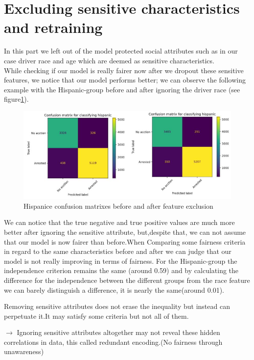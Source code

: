 \documentclass[doctype=studienarbeit,lang=english,BCOR=15mm,biblatex]{ldvbook}
\begin{document}
\section{Excluding sensitive characteristics and retraining}
In this part we left  out of the model protected social attributes such as in our case driver race and age which are deemed as sensitive characteristics.\\  
While checking if our model is really fairer now after we dropout these sensitive features, we notice that our model performs better; we can observe the following example with the Hispanic-group before and after ignoring the driver race (see figure\ref{fig:my_label}).
\begin{figure}[h]
  
    \includegraphics[width=0.98\columnwidth]{excluding.JPG}
    \caption{Hispanice confusion matrixes before and after feature exclusion}
    \label{fig:my_label}
\end{figure}
We can notice that the true negative and true positive values are much more better after ignoring the sensitive attribute, but,despite that, we can not assume that our model is now fairer than before.When Comparing some fairness criteria in regard to the same characteristics before and after we can judge that our model is not really improving in terms of fairness.
For the Hispanic-group the independence criterion remains the same (around 0.59) and by calculating the difference for the independence between the different groups from the race feature we can barely distinguish a difference, it is nearly the same\:(around 0.01).
	
Removing sensitive attributes does not erase the inequality but instead can perpetuate it.It may satisfy some criteria but not all of them.



$\longrightarrow$ Ignoring sensitive attributes altogether may not reveal these hidden correlations in data, this called redundant encoding.(No fairness through unawareness)
\end{document}
